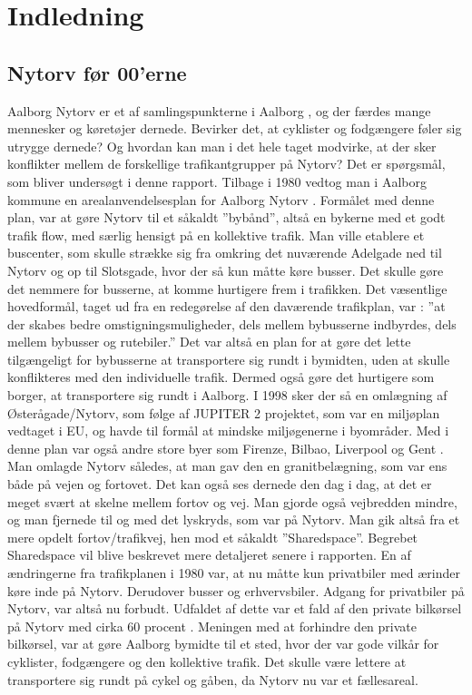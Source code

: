 \chapter{Indledning}
\label{chap:Indledning}

\section{Nytorv før 00'erne}
\label{sec:Nytorv før 00'erne}
Aalborg Nytorv er et af samlingspunkterne i Aalborg , og der færdes mange mennesker og køretøjer dernede. Bevirker det, at cyklister og fodgængere føler sig utrygge dernede? Og hvordan kan man i det hele taget modvirke, at der sker konflikter mellem de forskellige trafikantgrupper på Nytorv? Det er spørgsmål, som bliver undersøgt i denne rapport.
Tilbage i 1980 vedtog man i Aalborg kommune en arealanvendelsesplan for Aalborg Nytorv . Formålet med denne plan, var at gøre Nytorv til et såkaldt ”bybånd”, altså en bykerne med et godt trafik flow, med særlig hensigt på en kollektive trafik. Man ville etablere et buscenter, som skulle strække sig fra omkring det nuværende Adelgade ned til Nytorv og op til Slotsgade, hvor der så kun måtte køre busser. Det skulle gøre det nemmere for busserne, at komme hurtigere frem i trafikken. Det  væsentlige hovedformål, taget ud fra en redegørelse af den daværende trafikplan, var :
”at der skabes bedre omstigningsmuligheder, dels mellem bybusserne     indbyrdes, dels mellem bybusser og rutebiler.”
Det var altså en plan for at gøre det lette tilgængeligt for bybusserne at transportere sig rundt i bymidten, uden at skulle konflikteres med den individuelle trafik. Dermed også gøre det hurtigere som borger, at transportere sig rundt i Aalborg.
I 1998 sker der så en omlægning af Østerågade/Nytorv, som følge af JUPITER 2 projektet, som var en miljøplan vedtaget i EU, og havde til formål at mindske miljøgenerne i byområder. Med i denne plan var også andre store byer som Firenze, Bilbao, Liverpool og Gent . Man omlagde Nytorv således, at man gav den en granitbelægning, som var ens både på vejen og fortovet. Det kan også ses dernede den dag i dag, at det er meget svært at skelne mellem fortov og vej. Man gjorde også vejbredden mindre, og man fjernede til og med det lyskryds, som var på Nytorv. Man gik altså fra et mere opdelt fortov/trafikvej, hen mod et såkaldt ”Sharedspace”. Begrebet Sharedspace vil blive beskrevet mere detaljeret senere i rapporten. En af ændringerne fra trafikplanen i 1980 var, at nu måtte kun privatbiler med ærinder køre inde på Nytorv. Derudover busser og erhvervsbiler. Adgang for privatbiler på Nytorv, var altså nu forbudt. Udfaldet af dette var et fald af den private bilkørsel på Nytorv med cirka 60 procent . Meningen med at forhindre den private bilkørsel, var at gøre Aalborg bymidte til et sted, hvor der var gode vilkår for cyklister, fodgængere og den kollektive trafik. Det skulle være lettere at transportere sig rundt på cykel og gåben, da Nytorv nu var et fællesareal.

